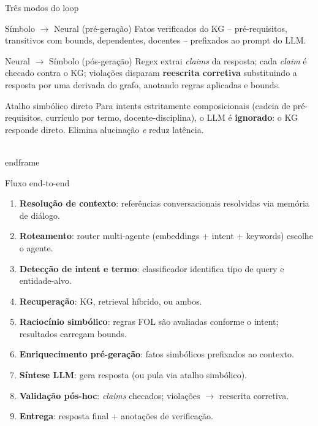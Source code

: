 \documentclass[aspectratio=169]{beamer}
\begin{document}
\begin{frame}{Três modos do loop}
  \begin{block}{Símbolo $\to$ Neural (pré-geração)}
    \small Fatos verificados do KG -- pré-requisitos, transitivos com bounds, dependentes, docentes -- prefixados ao prompt do LLM.
  \end{block}

  \begin{block}{Neural $\to$ Símbolo (pós-geração)}
    \small Regex extrai \emph{claims} da resposta; cada \emph{claim} é checado contra o KG; violações disparam \textbf{reescrita corretiva} substituindo a resposta por uma derivada do grafo, anotando regras aplicadas e bounds.
  \end{block}

  \begin{block}{Atalho simbólico direto}
    \small Para intents estritamente composicionais (cadeia de pré-requisitos, currículo por termo, docente-disciplina), o LLM é \textbf{ignorado}: o KG responde direto. Elimina alucinação \emph{e} reduz latência.
  \end{block}
\\end{frame}

\begin{frame}{Fluxo end-to-end}
  \footnotesize
  \begin{enumerate}
    \item \textbf{Resolução de contexto}: referências conversacionais resolvidas via memória de diálogo.
    \item \textbf{Roteamento}: router multi-agente (embeddings + intent + keywords) escolhe o agente.
    \item \textbf{Detecção de intent e termo}: classificador identifica tipo de query e entidade-alvo.
    \item \textbf{Recuperação}: KG, retrieval híbrido, ou ambos.
    \item \textbf{Raciocínio simbólico}: regras FOL são avaliadas conforme o intent; resultados carregam bounds.
    \item \textbf{Enriquecimento pré-geração}: fatos simbólicos prefixados ao contexto.
    \item \textbf{Síntese LLM}: gera resposta (ou pula via atalho simbólico).
    \item \textbf{Validação pós-hoc}: \emph{claims} checados; violações $\to$ reescrita corretiva.
    \item \textbf{Entrega}: resposta final + anotações de verificação.
  \end{enumerate}
\end{frame}


\end{frame}
\end{document}
